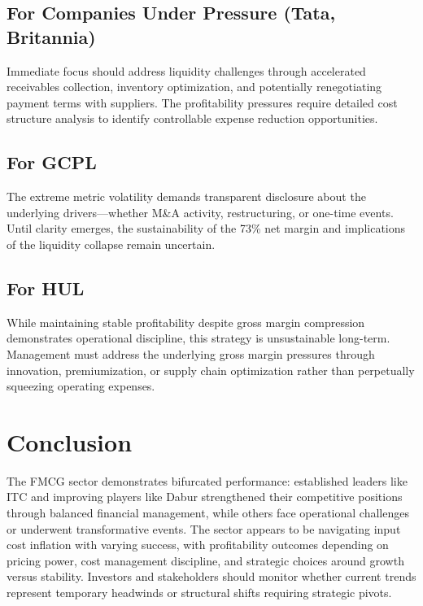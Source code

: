 \documentclass[12pt, a4paper]{report}
\begin{document}
\subsection{For Companies Under Pressure (Tata, Britannia)}

Immediate focus should address liquidity challenges through accelerated receivables collection, inventory optimization, and potentially renegotiating payment terms with suppliers. The profitability pressures require detailed cost structure analysis to identify controllable expense reduction opportunities.

\subsection{For GCPL}

The extreme metric volatility demands transparent disclosure about the underlying drivers—whether M\&A activity, restructuring, or one-time events. Until clarity emerges, the sustainability of the 73\% net margin and implications of the liquidity collapse remain uncertain.

\subsection{For HUL}

While maintaining stable profitability despite gross margin compression demonstrates operational discipline, this strategy is unsustainable long-term. Management must address the underlying gross margin pressures through innovation, premiumization, or supply chain optimization rather than perpetually squeezing operating expenses.

\section{Conclusion}

The FMCG sector demonstrates bifurcated performance: established leaders like ITC and improving players like Dabur strengthened their competitive positions through balanced financial management, while others face operational challenges or underwent transformative events. The sector appears to be navigating input cost inflation with varying success, with profitability outcomes depending on pricing power, cost management discipline, and strategic choices around growth versus stability. Investors and stakeholders should monitor whether current trends represent temporary headwinds or structural shifts requiring strategic pivots.
\end{document}
